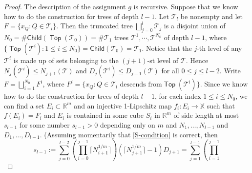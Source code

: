 \documentclass[12pt]{amsart}
\theoremstyle{definition}
\theoremstyle{remark}
\newcommand{\RR}{\mathbb{R}}
\newcommand{\XX}{\mathbb{X}}
\newcommand{\Child}{\mathsf{Child}}
\newcommand{\Top}{\mathop\mathsf{Top}}
\numberwithin{figure}{section}
\numberwithin{equation}{section}
\begin{document}
\begin{proof}
The description of the assignment $g$ is recursive. Suppose that we know how to do the construction for trees of depth $l-1$. Let $\mathcal{T}_l$ be nonempty and let $F=\{x_Q:Q\in\mathcal{T}_l\}$. Then the truncated tree $\bigsqcup_{j=0}^l\mathcal{T}_j$ is a disjoint union of $N_0=\#\Child(\Top(\mathcal{T}_0))=\#\mathcal{T}_1$ trees $\mathcal{T}^{1},\cdots,\mathcal{T}^{N_0}$ of depth $l-1$, where $\{\Top(\mathcal{T}^i):1\leq i\leq N_0\}=\Child(\mathcal{T}_0)=\mathcal{T}_1$. Notice that the $j$-th level of any $\mathcal{T}^i$ is made up of sets belonging to the $(j+1)$-st level of $\mathcal{T}$. Hence $N_j(\mathcal{T}^i)\leq N_{j+1}(\mathcal{T})$ and $D_j(\mathcal{T}^i)\leq D_{j+1}(\mathcal{T})$ for all $0\leq j\leq l-2$. Write $F=\bigsqcup_{i=1}^{N_0}F^i$, where $F^i=\{x_Q:Q\in\mathcal{T}_l\text{ descends from} \Top(\mathcal{T}^i)\}$. Since we know how to do the construction for trees of depth $l-1$, for each index $1\leq i\leq N_0$, we can find a set $E_i\subset \RR^m$ and an injective 1-Lipschitz map $f_i:E_i\rightarrow \XX$ such that $f(E_i)=F_i$ and $E_i$ is contained in some cube $S_i$ in $\RR^m$ of side length at most $s_{l-1}$ for some number $s_{l-1}>0$ depending only on $m$ and $N_1,\dots,N_{l-1}$ and $D_1,\dots,D_{l-1}$. (Assuming momentarily that \eqref{S-condition} is correct, then \begin{equation}\label{previous-s} s_{l-1}:= \sum_{j=0}^{l-2}\left(\prod_{i=0}^{j-1} \lceil N_{i+1}^{1/m}\rceil\right) (\lceil N_{j+1}^{1/m}\rceil-1)D_{j+1}=\sum_{j=1}^{l-1}\left(\prod_{i=1}^{j-1}

\end{equation}
\end{proof}
\end{document}
